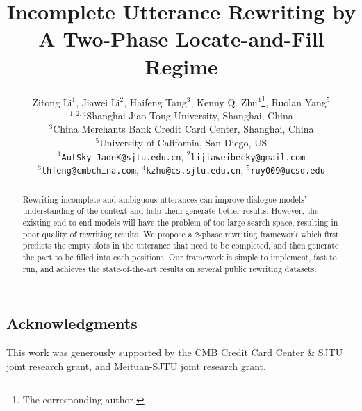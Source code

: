 \documentclass[11pt]{article}
\title{Incomplete Utterance Rewriting by A Two-Phase Locate-and-Fill Regime}
\author{Zitong Li$^1$, Jiawei Li$^2$, Haifeng Tang$^3$, Kenny Q. Zhu$^4$\thanks{\hspace{2mm}The corresponding author.}, Ruolan Yang$^5$\\
$^{1,2,4}$Shanghai Jiao Tong University, Shanghai, China \\
$^3$China Merchants Bank Credit Card Center, Shanghai, China \\
$^5$University of California, San Diego, US\\
\texttt{$^1$AutSky\_JadeK@sjtu.edu.cn}, 
\texttt{$^2$lijiaweibecky@gmail.com}\\ 
\texttt{$^3$thfeng@cmbchina.com}, 
\texttt{$^4$kzhu@cs.sjtu.edu.cn},
\texttt{$^5$ruy009@ucsd.edu}\\
}
\begin{document}
\begin{CJK}{UTF8}{gbsn}
\maketitle
\begin{abstract}
Rewriting incomplete and ambiguous utterances can improve dialogue models' understanding of
the context and help them generate better results.
However, the existing end-to-end models will have the problem of too large search space, resulting in poor quality of rewriting results.
We propose a 2-phase rewriting framework which first predicts the empty slots in the utterance that need to
be completed, and then generate the part to be filled into each positions. Our framework is 
simple to implement, fast to run, and achieves the state-of-the-art results on several public rewriting datasets.
\end{abstract}




%




\section*{Acknowledgments}
This work was generously supported by the CMB Credit Card Center \& SJTU
joint research grant, and Meituan-SJTU joint research grant.




\clearpage
\newpage
\appendix


\end{CJK}
\end{document}
